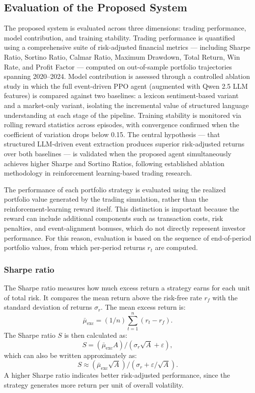 \documentclass[a4paper,fleqn]{cas-sc}
\begin{document}
\subsection{Evaluation of the Proposed System}\label{sec:Evaluation}
The proposed system is evaluated across three dimensions: trading performance, model contribution, and training stability. Trading performance is quantified using a comprehensive suite of risk-adjusted financial metrics — including Sharpe Ratio, Sortino Ratio, Calmar Ratio, Maximum Drawdown, Total Return, Win Rate, and Profit Factor — computed on out-of-sample portfolio trajectories spanning 2020–2024. Model contribution is assessed through a controlled ablation study in which the full event-driven PPO agent (augmented with Qwen 2.5 LLM features) is compared against two baselines: a lexicon sentiment-based variant and a market-only variant, isolating the incremental value of structured language understanding at each stage of the pipeline. Training stability is monitored via rolling reward statistics across episodes, with convergence confirmed when the coefficient of variation drops below 0.15. The central hypothesis — that structured LLM-driven event extraction produces superior risk-adjusted returns over both baselines — is validated when the proposed agent simultaneously achieves higher Sharpe and Sortino Ratios, following established ablation methodology in reinforcement learning-based trading research. 

The performance of each portfolio strategy is evaluated using the realized portfolio value generated by the trading simulation, rather than the reinforcement-learning reward itself. This distinction is important because the reward can include additional components such as transaction costs, risk penalties, and event-alignment bonuses, which do not directly represent investor performance. For this reason, evaluation is based on the sequence of end-of-period portfolio values, from which per-period returns \(r_t\) are computed.

\subsubsection{Sharpe ratio}
The Sharpe ratio measures how much excess return a strategy earns for each unit of total risk. It compares the mean return above the risk-free rate \(r_f\) with the standard deviation of returns \(\sigma_r\). The mean excess return is:
\begin{equation}
\bar{\mu}_{\mathrm{exc}} = (1/n)\sum_{t=1}^{n}(r_t - r_f).
\label{eq:mean-excess-return}
\end{equation}
The Sharpe ratio \(S\) is then calculated as:
\begin{equation}
S = (\bar{\mu}_{\mathrm{exc}} A)/(\sigma_r \sqrt{A} + \varepsilon),
\label{eq:sharpe}
\end{equation}
which can also be written approximately as:
\begin{equation}
S \approx (\bar{\mu}_{\mathrm{exc}} \sqrt{A})/(\sigma_r + \varepsilon/\sqrt{A}).
\label{eq:sharpe-approx}
\end{equation}
A higher Sharpe ratio indicates better risk-adjusted performance, since the strategy generates more return per unit of overall volatility.
\end{document}
